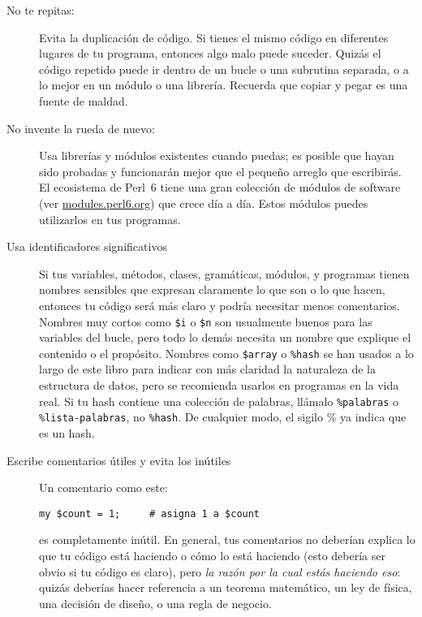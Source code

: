 \begin{description}

\item[No te repitas:] Evita la duplicación de código.
Si tienes el mismo código en diferentes lugares de tu programa,
entonces algo malo puede suceder. Quizás el código repetido
puede ir dentro de un bucle o una subrutina separada,
o a lo mejor en un módulo o una librería. Recuerda que copiar
y pegar es una fuente de maldad.

\item[No invente la rueda de nuevo:] Usa librerías y módulos
existentes cuando puedas; es posible que hayan sido probadas
y funcionarán mejor que el pequeño arreglo que escribirás.
El ecosistema de Perl~6 tiene una gran colección de módulos
de software (ver \url{modules.perl6.org})
que crece día a día. Estos módulos  puedes utilizarlos
en tus programas. 

\item[Usa identificadores significativos] Si tus variables, métodos,
clases, gramáticas, módulos, y programas tienen nombres sensibles
que expresan claramente lo que son o lo que hacen,
entonces tu código será más claro y podría necesitar menos
comentarios. Nombres muy cortos como \verb|$i| o \verb|$n|
son usualmente buenos para las variables del bucle, pero 
todo lo demás necesita un nombre que explique el contenido 
o el propósito. Nombres como \verb|$array| o \verb|%hash|
se han usados a lo largo de este libro para indicar 
con más claridad la naturaleza de la estructura de datos,
pero se recomienda usarlos en programas en la vida real.
Si tu hash contiene una colección de palabras, llámalo 
\verb|%palabras| o \verb|%lista-palabras|, no \verb|%hash|.
De cualquier modo, el sigilo \% ya indica que es un hash.

\item[Escribe comentarios útiles y evita los inútiles] Un 
comentario como este:
\begin{verbatim}
my $count = 1;     # asigna 1 a $count
\end{verbatim}
es completamente inútil. En general, tus comentarios no deberían
explica lo que tu código está haciendo o cómo lo está haciendo
(esto debería ser obvio si tu código es claro), pero
\emph{la razón por la cual estás haciendo eso}: quizás deberías
hacer referencia a un teorema matemático, un ley de física, una
decisión de diseño, o una regla de negocio.


\end{description}

